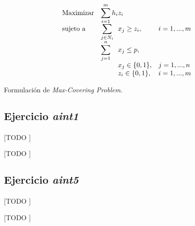\documentclass[spanish]{article}
\begin{document}
		\begin{eqfloat}
			\begin{equation}
				\begin{array}{ll@{}ll}
					\text{Maximizar}
						& \displaystyle\sum\limits_{i = 1}^{m} h_{i} & z_{i} 			&							\\
					\text{sujeto a}
						& \displaystyle\sum\limits_{j \in N_i}& x_{j} \geq z_i,		&i=1 ,..., m	\\
						& \displaystyle\sum\limits_{j = 1}^n 	& x_{j} \leq p,  		& 						\\
						&                                     &	x_{j} \in \{0,1\},&j=1 ,..., n 	\\
						&                                     &	z_{i} \in \{0,1\},&i=1 ,..., m  \\
				\end{array}
			\end{equation}
			\caption{Formulación de \emph{Max-Covering Problem}.}
			\label{eq:max_covering}
		\end{eqfloat}


		\subsection{Ejercicio \emph{aint1}}
		\label{sec:e-7a}

			\paragraph{}
			[TODO ]

			\begin{table}[p]
				\begin{center}
				\end{center}
				\caption{[TODO ]}
				\label{}
			\end{table}

		\subsection{Ejercicio \emph{aint5}}
		\label{sec:e-7b}

			\paragraph{}
			[TODO ]

			\begin{table}[p]
				\begin{center}
				\end{center}
				\caption{[TODO ]}
				\label{}
			\end{table}
\end{document}
